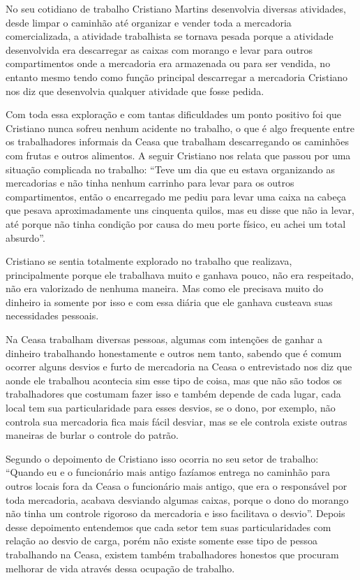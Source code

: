  No seu cotidiano de trabalho Cristiano Martins desenvolvia diversas atividades, desde limpar o caminhão
 até organizar e vender toda a mercadoria comercializada, a atividade trabalhista se tornava pesada porque
 a atividade desenvolvida era descarregar as caixas com morango e levar para outros compartimentos onde a
 mercadoria era armazenada ou para ser vendida, no entanto mesmo tendo como função principal descarregar 
 a mercadoria Cristiano nos diz que desenvolvia qualquer atividade que fosse pedida. 
 
 Com toda essa exploração
 e com tantas dificuldades um ponto positivo foi que Cristiano nunca sofreu nenhum acidente no trabalho, 
 o que é algo frequente entre os trabalhadores informais da Ceasa que trabalham descarregando os caminhões
 com frutas e outros alimentos. A seguir Cristiano nos relata que passou por uma situação complicada no 
 trabalho: ``Teve um dia que eu estava organizando as mercadorias e não tinha nenhum carrinho para levar
 para os outros compartimentos, então o encarregado me pediu para levar uma caixa na cabeça que pesava 
 aproximadamente uns cinquenta quilos, mas eu disse que não ia levar, até porque não tinha condição por 
 causa do meu porte físico, eu achei um total absurdo''.

 Cristiano se sentia totalmente explorado no trabalho que realizava, principalmente porque ele trabalhava
 muito e ganhava pouco, não era respeitado, não era valorizado de nenhuma maneira. Mas como ele precisava 
 muito do dinheiro ia somente por isso e com essa diária que ele ganhava custeava suas necessidades pessoais.

 Na Ceasa trabalham diversas pessoas, algumas com intenções de ganhar a dinheiro trabalhando honestamente
 e outros nem tanto, sabendo que é comum ocorrer alguns desvios e furto de mercadoria na Ceasa o entrevistado 
 nos diz que aonde ele trabalhou acontecia sim esse tipo de coisa, mas que não são todos os trabalhadores que
 costumam fazer isso e também depende de cada lugar, cada local tem sua particularidade para esses desvios,
 se o dono, por exemplo, não controla sua mercadoria fica mais fácil desviar, mas se ele controla existe 
 outras maneiras de burlar o controle do patrão. 
 
 Segundo o depoimento de Cristiano isso ocorria no seu setor
 de trabalho: ``Quando eu e o funcionário mais antigo fazíamos entrega no caminhão para outros locais fora da
 Ceasa o funcionário mais antigo, que era o responsável por toda mercadoria, acabava desviando algumas caixas,
 porque o dono do morango não tinha um controle rigoroso da mercadoria e isso facilitava o desvio''. Depois 
 desse depoimento entendemos que cada setor tem suas particularidades com relação ao desvio de carga, porém 
 não existe somente esse tipo de pessoa trabalhando na Ceasa, existem também trabalhadores honestos que 
 procuram melhorar de vida através dessa ocupação de trabalho.

